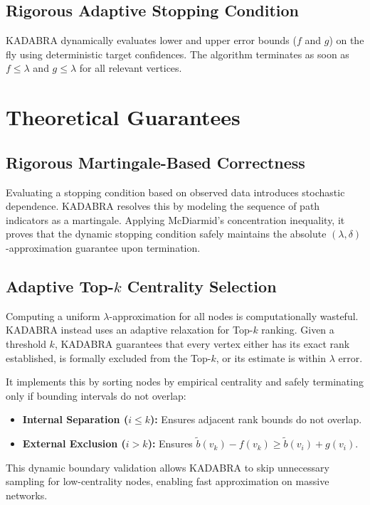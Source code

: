 \subsection{Rigorous Adaptive Stopping Condition}
KADABRA dynamically evaluates lower and upper error bounds ($f$ and $g$) on the fly using deterministic target confidences. The algorithm terminates as soon as $f \le \lambda$ and $g \le \lambda$ for all relevant vertices.

\section{Theoretical Guarantees}

\subsection{Rigorous Martingale-Based Correctness}
Evaluating a stopping condition based on observed data introduces stochastic dependence. KADABRA resolves this by modeling the sequence of path indicators as a martingale. Applying McDiarmid's concentration inequality, it proves that the dynamic stopping condition safely maintains the absolute $(\lambda, \delta)$-approximation guarantee upon termination.

\subsection{Adaptive Top-$k$ Centrality Selection}
Computing a uniform $\lambda$-approximation for all nodes is computationally wasteful. KADABRA instead uses an adaptive relaxation for Top-$k$ ranking. Given a threshold $k$, KADABRA guarantees that every vertex either has its exact rank established, is formally excluded from the Top-$k$, or its estimate is within $\lambda$ error. 

It implements this by sorting nodes by empirical centrality and safely terminating only if bounding intervals do not overlap:
\begin{itemize}
    \item \textbf{Internal Separation ($i \le k$):} Ensures adjacent rank bounds do not overlap.
    \item \textbf{External Exclusion ($i > k$):} Ensures $\tilde{b}(v_k) - f(v_k) \ge \tilde{b}(v_i) + g(v_i)$.
\end{itemize}
This dynamic boundary validation allows KADABRA to skip unnecessary sampling for low-centrality nodes, enabling fast approximation on massive networks.